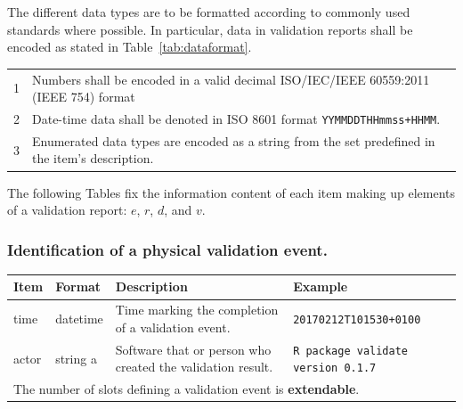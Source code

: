 \documentclass[a4paper, 11pt,titlepage]{article}
\newcommand{\code}[1]{\texttt{#1}}
\begin{document}
The different data types are to be formatted according to commonly used
standards where possible. In particular, data in validation reports shall be
encoded as stated in Table~\ref{tab:dataformat}.
\begin{center}
\begin{tabular}{|lp{}|}
\hline
1&Numbers shall be encoded in a valid decimal ISO/IEC/IEEE 60559:2011 (IEEE 754) format \\
2&Date-time data shall be denoted in ISO 8601 format \code{YYMMDDTHHmmss+HHMM}. \\
3&Enumerated data types are encoded as a string from the set predefined in the item's description.\\
\hline
\end{tabular}
\label{tab:dataformat}
\end{center}

The following Tables fix the information content of each item making up elements of 
a validation report: $e$, $r$, $d$, and $v$.

\subsubsection{Identification of a physical validation event.}
%
\begin{center}
\begin{tabular}{|lp{15mm}p{}p{}|}
\hline
\textbf{Item} & \textbf{Format} & \textbf{Description} &\textbf{Example}\\
\hline
time          & datetime & Time marking the completion of a validation event. & \code{20170212T101530+0100}\\
actor         & string        a  & Software that or person who created the validation result. & \code{R package validate version 0.1.7}\\
\hline
\multicolumn{4}{|l|}{The number of slots defining a validation event is \textbf{extendable}.
}\\
\hline
\end{tabular}
\end{center}
\end{document}
